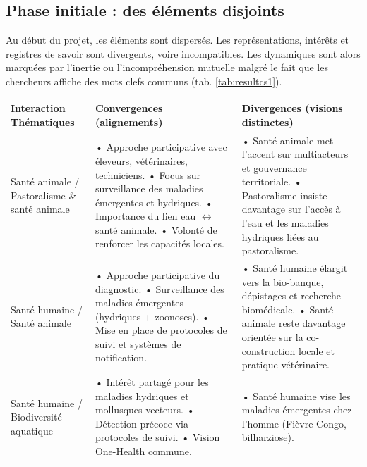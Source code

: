\documentclass{article}
\begin{document}
\subsection{Phase initiale : des éléments disjoints}\label{sec:Phaseinit}
Au début du projet, les éléments sont dispersés. Les représentations, intérêts et registres de savoir sont divergents, voire incompatibles. Les dynamiques sont alors marquées par l'inertie ou l'incompréhension mutuelle malgré le fait que les chercheurs affiche des mots clefs communs (tab. \ref{tab:resultcs1}).

\begin{table}[h!]
\centering
\footnotesize
\begin{tabularx}{\textwidth}{>{\raggedright\arraybackslash}p{3.2cm} X X}
\hline
\textbf{Interaction Thématiques} & \textbf{Convergences (alignements)} & \textbf{Divergences (visions distinctes)} \\
\hline
Santé animale / Pastoralisme \& santé animale 
& • Approche participative avec éleveurs, vétérinaires, techniciens. \newline 
• Focus sur surveillance des maladies émergentes et hydriques. \newline
• Importance du lien eau $\leftrightarrow$ santé animale. \newline
• Volonté de renforcer les capacités locales. 
& • Santé animale met l'accent sur multiacteurs et gouvernance territoriale. \newline
• Pastoralisme insiste davantage sur l'accès à l'eau et les maladies hydriques liées au pastoralisme. \\
\hline
Santé humaine / Santé animale 
& • Approche participative du diagnostic. \newline
• Surveillance des maladies émergentes (hydriques + zoonoses). \newline
• Mise en place de protocoles de suivi et systèmes de notification.
& • Santé humaine élargit vers la bio-banque, dépistages et recherche biomédicale. \newline
• Santé animale reste davantage orientée sur la co-construction locale et pratique vétérinaire. \\
\hline
Santé humaine / Biodiversité aquatique 
& • Intérêt partagé pour les maladies hydriques et mollusques vecteurs. \newline
• Détection précoce via protocoles de suivi. \newline
• Vision One-Health commune.
& • Santé humaine vise les maladies émergentes chez l'homme (Fièvre Congo, bilharziose). \newline

\end{tabularx}
\end{table}
\end{document}
